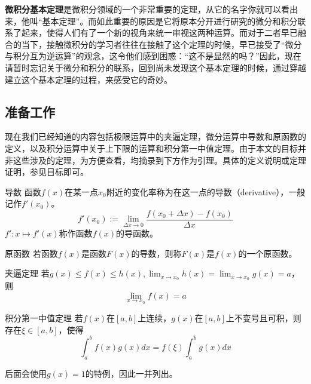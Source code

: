 
\begin{issues}
\issueTODO
\issueMissDepend
\issueNeedCite
\end{issues}


\textbf{微积分基本定理}是微积分领域的一个非常重要的定理，从它的名字你就可以看出来，他叫“基本定理”。而如此重要的原因是它将原本分开进行研究的微分和积分联系了起来，使得人们有了一个新的视角来统一审视这两种运算。而对于二者早已融合的当下，接触微积分的学习者往往在接触了这个定理的时候，早已接受了“微分与积分互为逆运算”的观念，这令他们感到困惑：“这不是显然的吗？”因此，现在请暂时忘记关于微分和积分的联系，回到尚未发现这个基本定理的时候，通过穿越建立这个基本定理的过程，来感受它的奇妙。

\subsection{准备工作}

现在我们已经知道的内容包括极限运算中的夹逼定理，微分运算中导数和原函数的定义，以及积分运算中关于上下限的运算和积分第一中值定理。由于本文的目标并非这些涉及的定理，为方便查看，均摘录到下方作为引理。具体的定义说明或定理证明，参见目标即可。

\begin{definition}{导数}
函数$f(x)$在某一点$x_0$附近的变化率称为在这一点的导数（derivative），一般记作$f'(x_0)$。
$$f'(x_0):=\lim_{\Delta x\to0}{\frac{f(x_0+\Delta x)-f(x_0)}{\Delta x}}$$
$f':x\mapsto f'(x)$称作函数$f(x)$的导函数。
\end{definition}

\begin{definition}{原函数}
若函数$f(x)$是函数$F(x)$的导数，则称$F(x)$是$f(x)$的一个原函数。
\end{definition}

\begin{lemma}{夹逼定理}
若$g(x)\leq f(x)\leq h(x),\lim _{x\to x_0}h(x)=\lim _{x\to x_0}g(x)=a$，则
$$\lim _{x\to x_0}f(x)=a$$
\end{lemma}

\begin{lemma}{积分第一中值定理}
若$f(x)$在$[a,b]$上连续，$g(x)$在$[a,b]$上不变号且可积，则存在$\xi\in[a,b]$，使得
$$\int_{a}^{b} f(x)g(x)dx=f(\xi)\int_{a}^{b} g(x)dx$$
\end{lemma}

后面会使用$g(x)=1$的特例，因此一并列出。

